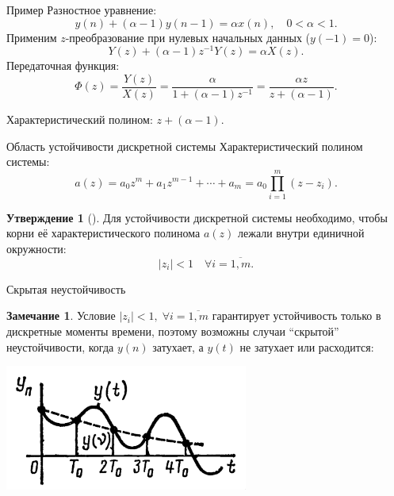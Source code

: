 \documentclass[notheorems,aspectratio=169]{beamer}
\theoremstyle{definition}
\newtheorem{remark}{Замечание}
\newtheorem{proposition}{Утверждение}
\newcommand{\abs}[1]{\left| #1 \right|}
\begin{document}
\begin{frame}{Пример}
  Разностное уравнение:
  \begin{equation*}
    y(n) + (\alpha - 1) y(n - 1) = \alpha x(n), \quad 0 < \alpha < 1.
  \end{equation*}
  Применим $z$-преобразование при нулевых начальных данных ($y(-1) = 0$):
  \begin{equation*}
    Y(z) + (\alpha - 1) z^{-1} Y(z) = \alpha X(z).
  \end{equation*}
  Передаточная функция:
  \begin{equation*}
    \Phi(z) = \frac{Y(z)}{X(z)} = \frac{\alpha}{1 + (\alpha - 1) z^{-1}} = \frac{\alpha z}{z + (\alpha - 1)}.
  \end{equation*}

  Характеристический полином: $z + (\alpha - 1)$.
\end{frame}

\begin{frame}{Область устойчивости дискретной системы}
  Характеристический полином системы:
  \begin{equation*}
    a(z) = a_0 z^m + a_1 z^{m-1} + \cdots + a_m = a_0 \prod_{i=1}^m (z - z_i).
  \end{equation*}

  \begin{proposition}[{\cite[с.~259]{Kargu1974}}]
    Для устойчивости дискретной системы необходимо, чтобы корни её характеристического полинома
    $a(z)$ лежали внутри единичной окружности:
    \begin{equation*}
      \abs{z_i} < 1 \quad \forall i=\overline{1,m}.
    \end{equation*}
  \end{proposition}
\end{frame}

\begin{frame}{Скрытая неустойчивость}
  \begin{remark}
    Условие $\abs{z_i} < 1, \; \forall i=\overline{1,m}$ гарантирует устойчивость только в дискретные моменты времени,
    поэтому возможны случаи ``скрытой'' неустойчивости, когда $y(n)$ затухает, а $y(t)$ не затухает или расходится:
    \begin{center}
      \includegraphics[width=8cm]{HiddenInstability}
    \end{center}
  \end{remark}
\end{frame}
\end{document}
